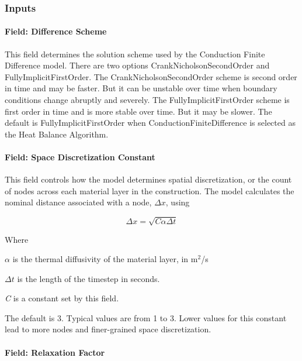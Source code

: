 \subsubsection{Inputs}\label{inputs-7-025}

\paragraph{Field: Difference Scheme}\label{field-difference-scheme}

This field determines the solution scheme used by the Conduction Finite Difference model. There are two options CrankNicholsonSecondOrder and FullyImplicitFirstOrder. The CrankNicholsonSecondOrder scheme is second order in time and may be faster. But it can be unstable over time when boundary conditions change abruptly and severely. The FullyImplicitFirstOrder scheme is first order in time and is more stable over time. But it may be slower. The default is FullyImplicitFirstOrder when ConductionFiniteDifference is selected as the Heat Balance Algorithm.

\paragraph{Field: Space Discretization Constant}\label{field-space-discretization-constant}

This field controls how the model determines spatial discretization, or the count of nodes across each material layer in the construction. The model calculates the nominal distance associated with a node, \(\Delta x\), using

\begin{equation}
    \Delta x = \sqrt {C\alpha \Delta t}
\end{equation}

Where

\(\alpha\) is the thermal diffusivity of the material layer, in m\(^{2}\)/s

\(\Delta t\) is the length of the timestep in seconds.

\emph{C} is a constant set by this field.

The default is 3. Typical values are from 1 to 3. Lower values for this constant lead to more nodes and finer-grained space discretization.

\paragraph{Field: Relaxation Factor}\label{field-relaxation-factor}

